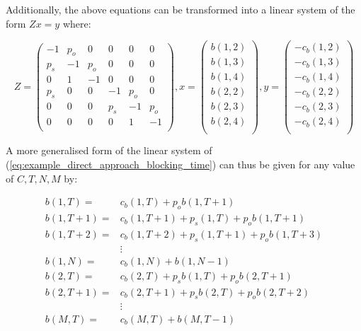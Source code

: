 Additionally, the above equations can be transformed into a linear system of the
form \(Zx=y\) where:

\begin{equation}\label{eq:example_direct_approach_blocking_time}
    Z=
    \begin{pmatrix}
         -1 & p_o &   0 &   0 &   0 &   0 \\ %
        p_s &  -1 & p_o &   0 &   0 &   0 \\ %
          0 &   1 & - 1 &   0 &   0 &   0 \\ %
        p_s &   0 &   0 &  -1 & p_o &   0 \\ %
          0 &   0 &   0 & p_s &  -1 & p_o \\ %
          0 &   0 &   0 &   0 &   1 &  -1 \\ %
    \end{pmatrix},
    x=
    \begin{pmatrix}
        b(1,2) \\
        b(1,3) \\
        b(1,4) \\
        b(2,2) \\
        b(2,3) \\
        b(2,4) \\
    \end{pmatrix},
    y=
    \begin{pmatrix}
        -c_b(1,2) \\
        -c_b(1,3) \\
        -c_b(1,4) \\
        -c_b(2,2) \\
        -c_b(2,3) \\
        -c_b(2,4) \\
    \end{pmatrix}
\end{equation}

A more generalised form of the linear system of
(\ref{eq:example_direct_approach_blocking_time}) can thus be given for any value
of \(C,T,N,M\) by:

\begin{align}
    b(1,T) =& c_b(1, T) + p_o b(1, T + 1)
    \label{eq:first_eq_of_blocking_general}\\
    b(1,T + 1) =& c_b(1, T + 1) + p_s(1, T) + p_o b(1, T + 1) \\
    b(1,T + 2) =& c_b(1, T + 2) + p_s(1, T + 1) + p_o b(1, T + 3) \\
    & \vdots \\
    b(1, N) =& c_b(1, N) + b(1, N - 1) \\
    b(2, T) =& c_b(2, T) + p_s b(1, T) + p_o b(2, T + 1) \\
    b(2, T + 1) =& c_b(2, T + 1) + p_s b(2, T) + p_o b(2, T + 2) \\
    & \vdots \\
    b(M, T) =& c_b(M, T) + b(M, T-1) \label{eq:last_eq_of_blocking_general}
\end{align}


